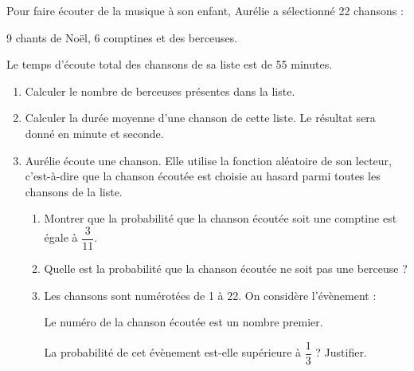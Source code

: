 \documentclass[exercice,a4]{thedocument}%
\begin{document}
%
\medskip

Pour faire écouter de la musique à son enfant, Aurélie a sélectionné 22 chansons :

9 chants de Noël, 6 comptines et des berceuses.

Le temps d'écoute total des chansons de sa liste est de 55 minutes.

\medskip

\begin{enumerate}
\item Calculer le nombre de berceuses présentes dans la liste.
\item Calculer la durée moyenne d'une chanson de cette liste. Le résultat sera donné en
minute et seconde.
\item Aurélie écoute une chanson. Elle utilise la fonction aléatoire de son lecteur, c'est-à-dire que la chanson écoutée est choisie au hasard parmi toutes les chansons de la liste.
	\begin{enumerate}
		\item Montrer que la probabilité que la chanson écoutée soit une comptine est égale à $\dfrac{3}{11}$.
		\item Quelle est la probabilité que la chanson écoutée ne soit pas une berceuse ?
		\item Les chansons sont numérotées de 1 à 22. On considère l'évènement :
		
\begin{center}\og Le numéro de la chanson écoutée est un nombre premier. \fg\end{center}
La probabilité de cet évènement est-elle supérieure à
$\dfrac13$ ? Justifier.
	\end{enumerate}
\end{enumerate}

\bigskip
\showthesource
\end{document}
